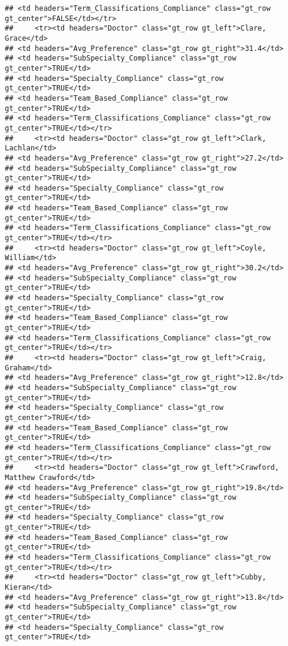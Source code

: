 \documentclass[
]{article}
\begin{document}
\begin{verbatim}
## <td headers="Term_Classifications_Compliance" class="gt_row gt_center">FALSE</td></tr>
##     <tr><td headers="Doctor" class="gt_row gt_left">Clare, Grace</td>
## <td headers="Avg_Preference" class="gt_row gt_right">31.4</td>
## <td headers="SubSpecialty_Compliance" class="gt_row gt_center">TRUE</td>
## <td headers="Specialty_Compliance" class="gt_row gt_center">TRUE</td>
## <td headers="Team_Based_Compliance" class="gt_row gt_center">TRUE</td>
## <td headers="Term_Classifications_Compliance" class="gt_row gt_center">TRUE</td></tr>
##     <tr><td headers="Doctor" class="gt_row gt_left">Clark, Lachlan</td>
## <td headers="Avg_Preference" class="gt_row gt_right">27.2</td>
## <td headers="SubSpecialty_Compliance" class="gt_row gt_center">TRUE</td>
## <td headers="Specialty_Compliance" class="gt_row gt_center">TRUE</td>
## <td headers="Team_Based_Compliance" class="gt_row gt_center">TRUE</td>
## <td headers="Term_Classifications_Compliance" class="gt_row gt_center">TRUE</td></tr>
##     <tr><td headers="Doctor" class="gt_row gt_left">Coyle, William</td>
## <td headers="Avg_Preference" class="gt_row gt_right">30.2</td>
## <td headers="SubSpecialty_Compliance" class="gt_row gt_center">TRUE</td>
## <td headers="Specialty_Compliance" class="gt_row gt_center">TRUE</td>
## <td headers="Team_Based_Compliance" class="gt_row gt_center">TRUE</td>
## <td headers="Term_Classifications_Compliance" class="gt_row gt_center">TRUE</td></tr>
##     <tr><td headers="Doctor" class="gt_row gt_left">Craig, Graham</td>
## <td headers="Avg_Preference" class="gt_row gt_right">12.8</td>
## <td headers="SubSpecialty_Compliance" class="gt_row gt_center">TRUE</td>
## <td headers="Specialty_Compliance" class="gt_row gt_center">TRUE</td>
## <td headers="Team_Based_Compliance" class="gt_row gt_center">TRUE</td>
## <td headers="Term_Classifications_Compliance" class="gt_row gt_center">TRUE</td></tr>
##     <tr><td headers="Doctor" class="gt_row gt_left">Crawford, Matthew Crawford</td>
## <td headers="Avg_Preference" class="gt_row gt_right">19.8</td>
## <td headers="SubSpecialty_Compliance" class="gt_row gt_center">TRUE</td>
## <td headers="Specialty_Compliance" class="gt_row gt_center">TRUE</td>
## <td headers="Team_Based_Compliance" class="gt_row gt_center">TRUE</td>
## <td headers="Term_Classifications_Compliance" class="gt_row gt_center">TRUE</td></tr>
##     <tr><td headers="Doctor" class="gt_row gt_left">Cubby, Kieran</td>
## <td headers="Avg_Preference" class="gt_row gt_right">13.8</td>
## <td headers="SubSpecialty_Compliance" class="gt_row gt_center">TRUE</td>
## <td headers="Specialty_Compliance" class="gt_row gt_center">TRUE</td>

\end{verbatim}
\end{document}
